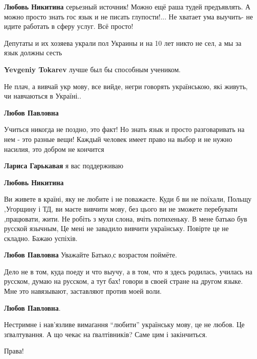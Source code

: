 \begin{itemize}
{\begin{itemize}
\textbf{Любовь Никитина} серьезный источник!
Можно ещё раша тудей предъявлять.
А можно просто знать гос язык и не писать глупости!... 
Не хватает ума выучить- не идите работать в сферу услуг.
Всё просто!

Депутаты и их хозяева украли пол Украины и на 10 лет никто не сел, а мы за язык должны сесть

\textbf{Yevgeniy Tokarev} лучше был бы способным учеником.
\end{itemize}


Не плач, а вивчай укр мову, все вийде, негри говорять українською, які живуть,
чи навчаються в Україні..

\begin{itemize}

\textbf{Любов Павловна}

Учиться никогда не поздно, это факт! Но знать язык и просто разговаривать на нем - это разные вещи! Каждый человек имеет право на выбор и не нужно насилия, это добром не кончится

\textbf{Лариса Гарькавая} я вас поддерживаю

\textbf{Любовь Никитина}

Ви живете в країні, яку не любите і не поважаєте. Куди б ви не поїхали, Польщу
,Угорщину і ТД, ви маєте вивчити мову, без цього ви не зможете перебувати
,працювати, жити. Не робіть з мухи слона, вчіть потихеньку.  В мене батько був
русской язычным, Це мені не завадило вивчити українську. Повірте це не складно.
Бажаю успіхів.

\textbf{Любов Павловна} Уважайте Батько,с возрастом поймёте.

Дело не в том, куда поеду и что выучу, а в том, что я здесь родилась, училась
на русском, думаю на русском, а тут бах! говори в своей стране на другом языке.
Мне это навязывают, заставляют против моей воли.

\textbf{Любов Павловна}.

Нестримне і нав'язливе вимаґання \enquote{любити} українську мову, це не любов.
Це зґвалтування.  А що чекає на ґвалтівників? Саме цим і закінчиться.

\end{itemize}

Права!

}
\end{itemize}

